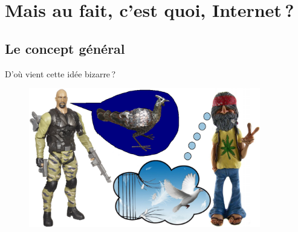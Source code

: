 \section[C'est quoi, Internet ?]{Mais au fait, c'est quoi, Internet ?}

\subsection{Le concept général}

\begin{frame}{D'où vient cette idée bizarre ?}
  \begin{figure}
    \includegraphics[width=0.9\textwidth]{concepts/usarmy.png}
  \end{figure}
\end{frame}

